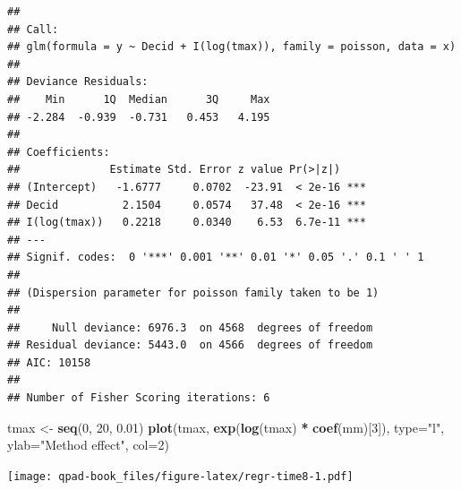 \documentclass[12pt,]{book}
\newenvironment{Shaded}{\begin{snugshade}}{\end{snugshade}}
\newcommand{\DataTypeTok}[1]{\textcolor[rgb]{0.13,0.29,0.53}{#1}}
\newcommand{\DecValTok}[1]{\textcolor[rgb]{0.00,0.00,0.81}{#1}}
\newcommand{\FloatTok}[1]{\textcolor[rgb]{0.00,0.00,0.81}{#1}}
\newcommand{\KeywordTok}[1]{\textcolor[rgb]{0.13,0.29,0.53}{\textbf{#1}}}
\newcommand{\NormalTok}[1]{#1}
\newcommand{\OperatorTok}[1]{\textcolor[rgb]{0.81,0.36,0.00}{\textbf{#1}}}
\newcommand{\StringTok}[1]{\textcolor[rgb]{0.31,0.60,0.02}{#1}}
\begin{document}
\begin{Shaded}
\end{Shaded}

\begin{verbatim}
## 
## Call:
## glm(formula = y ~ Decid + I(log(tmax)), family = poisson, data = x)
## 
## Deviance Residuals: 
##    Min      1Q  Median      3Q     Max  
## -2.284  -0.939  -0.731   0.453   4.195  
## 
## Coefficients:
##              Estimate Std. Error z value Pr(>|z|)    
## (Intercept)   -1.6777     0.0702  -23.91  < 2e-16 ***
## Decid          2.1504     0.0574   37.48  < 2e-16 ***
## I(log(tmax))   0.2218     0.0340    6.53  6.7e-11 ***
## ---
## Signif. codes:  0 '***' 0.001 '**' 0.01 '*' 0.05 '.' 0.1 ' ' 1
## 
## (Dispersion parameter for poisson family taken to be 1)
## 
##     Null deviance: 6976.3  on 4568  degrees of freedom
## Residual deviance: 5443.0  on 4566  degrees of freedom
## AIC: 10158
## 
## Number of Fisher Scoring iterations: 6
\end{verbatim}

\begin{Shaded}
\begin{Highlighting}[]
\NormalTok{tmax <-}\StringTok{ }\KeywordTok{seq}\NormalTok{(}\DecValTok{0}\NormalTok{, }\DecValTok{20}\NormalTok{, }\FloatTok{0.01}\NormalTok{)}
\KeywordTok{plot}\NormalTok{(tmax, }\KeywordTok{exp}\NormalTok{(}\KeywordTok{log}\NormalTok{(tmax) }\OperatorTok{*}\StringTok{ }\KeywordTok{coef}\NormalTok{(mm)[}\DecValTok{3}\NormalTok{]), }\DataTypeTok{type=}\StringTok{"l"}\NormalTok{,}
  \DataTypeTok{ylab=}\StringTok{"Method effect"}\NormalTok{, }\DataTypeTok{col=}\DecValTok{2}\NormalTok{)}
\end{Highlighting}
\end{Shaded}

\texttt{[image: qpad-book\_files/figure-latex/regr-time8-1.pdf]}
\end{document}
